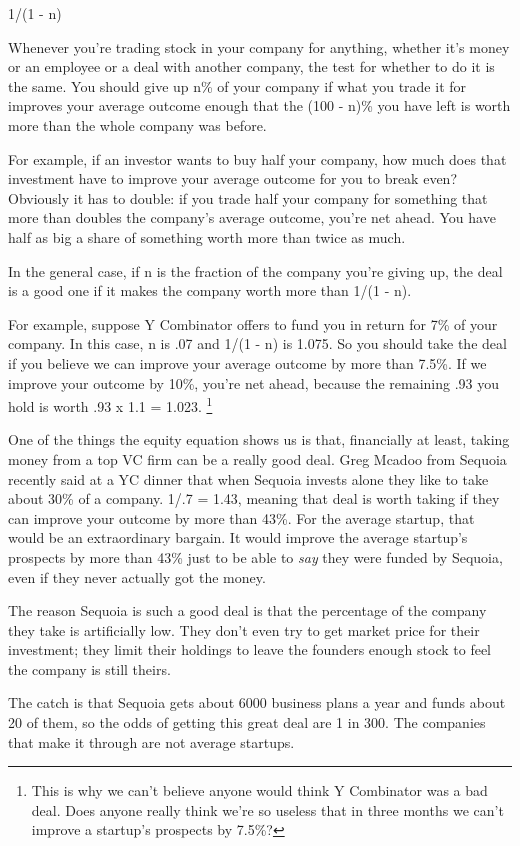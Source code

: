 \documentclass[12pt]{book}
\begin{document}
1/(1 - n)

Whenever you're trading stock in your company for anything, whether it's
money or an employee or a deal with another company, the test for
whether to do it is the same. You should give up n\% of your company if
what you trade it for improves your average outcome enough that the (100
- n)\% you have left is worth more than the whole company was before.

For example, if an investor wants to buy half your company, how much
does that investment have to improve your average outcome for you to
break even? Obviously it has to double: if you trade half your company
for something that more than doubles the company's average outcome,
you're net ahead. You have half as big a share of something worth more
than twice as much.

In the general case, if n is the fraction of the company you're giving
up, the deal is a good one if it makes the company worth more than 1/(1
- n).

For example, suppose Y Combinator offers to fund you in return for 7\%
of your company. In this case, n is .07 and 1/(1 - n) is 1.075. So you
should take the deal if you believe we can improve your average outcome
by more than 7.5\%. If we improve your outcome by 10\%, you're net
ahead, because the remaining .93 you hold is worth .93 x 1.1 = 1.023.
\footnote{This is why we can't believe anyone would think Y Combinator was
a bad deal. Does anyone really think we're so useless that in three
months we can't improve a startup's prospects by 7.5\%?}

One of the things the equity equation shows us is that, financially at
least, taking money from a top VC firm can be a really good deal. Greg
Mcadoo from Sequoia recently said at a YC dinner that when Sequoia
invests alone they like to take about 30\% of a company. 1/.7 = 1.43,
meaning that deal is worth taking if they can improve your outcome by
more than 43\%. For the average startup, that would be an extraordinary
bargain. It would improve the average startup's prospects by more than
43\% just to be able to \emph{say} they were funded by Sequoia, even if
they never actually got the money.

The reason Sequoia is such a good deal is that the percentage of the
company they take is artificially low. They don't even try to get market
price for their investment; they limit their holdings to leave the
founders enough stock to feel the company is still theirs.

The catch is that Sequoia gets about 6000 business plans a year and
funds about 20 of them, so the odds of getting this great deal are 1 in
300. The companies that make it through are not average startups.
\end{document}
